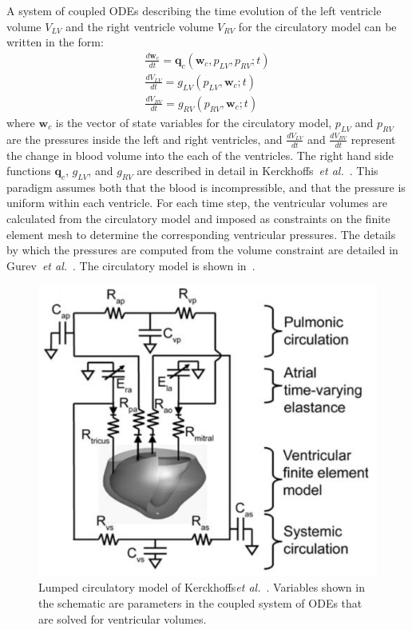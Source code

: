 A system of coupled ODEs describing the time evolution of the left ventricle volume $V_{LV}$ and the right ventricle volume $V_{RV}$ for the circulatory model can be written in the form:
\begin{align}
\frac{d\bm{w}_{c}}{dt} = \bm{q}_c(\bm{w}_c, p_{LV}, p_{RV}; t) \\
\frac{dV_{LV}}{dt} = g_{LV}(p_{LV}, \bm{w}_c; t) \\
\frac{dV_{RV}}{dt} = g_{RV}(p_{RV}, \bm{w}_c; t)
\end{align}
where $\bm{w}_c$ is the vector of state variables for the circulatory model, $p_{LV}$ and $p_{RV}$ are the  pressures inside the left and right ventricles, and $\frac{dV_{LV}}{dt}$ and $\frac{dV_{RV}}{dt}$ represent the change in blood volume into the each of the ventricles. The right hand side functions $\bm{q}_c$, $g_{LV}$, and $g_{RV}$ are described in detail in Kerckhoffs~\textit{et al.}~\cite{kerckhoffs_2006}. This paradigm assumes both that the blood is incompressible, and that the pressure is uniform within each ventricle. For each time step, the ventricular volumes are calculated from the circulatory model and imposed as constraints on the finite element mesh to determine the corresponding ventricular pressures. The details by which the pressures are computed from the volume constraint are detailed in Gurev~\textit{et al.}~\cite{gurev_2015}. The circulatory model is shown in~.
\begin{figure}[ht]
\centering
		\includegraphics[scale=0.3]{media/bcs.png}
\caption{Lumped circulatory model of Kerckhoffs\textit{et al.}~\cite{kerckhoffs_2006}. Variables shown in the schematic are parameters in the coupled system of ODEs that are solved for ventricular volumes.}
\label{fig:bcs}
\end{figure}


